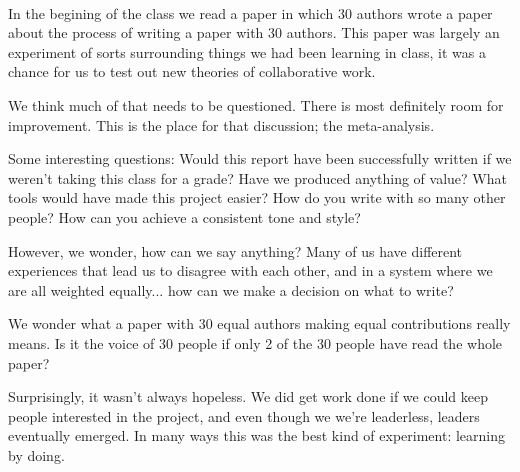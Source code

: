 \\
In the begining of the class we read a paper \cite{tomlinson2012} in which 30 authors wrote a paper about the process of writing a paper with 30 authors. This paper was largely an experiment of sorts surrounding things we had been learning in class, it was a chance for us to test out new theories of collaborative work.

We think much of that needs to be questioned. There is most definitely room for improvement. This is the place for that discussion; the meta-analysis.

Some interesting questions:
Would this report have been successfully written if we weren't taking this class for a grade?
Have we produced anything of value?
What tools would have made this project easier? 
How do you write with so many other people? 
How can you achieve a consistent tone and style? 

However, we wonder, how can we say anything? Many of us have different experiences that lead us to disagree with each other, and in a system where we are all weighted equally... how can we make a decision on what to write?

We wonder what a paper with 30 equal authors making equal contributions really means. Is it the voice of 30 people if only 2 of the 30 people have read the whole paper?

Surprisingly, it wasn't always hopeless. We did get work done if we could keep people interested in the project, and even though we we're leaderless, leaders eventually emerged. In many ways this was the best kind of experiment: learning by doing.  






